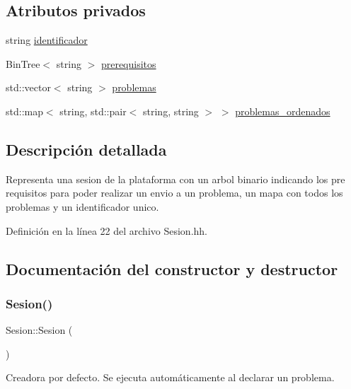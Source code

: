 \subsection*{Atributos privados}
\begin{DoxyCompactItemize}
\item 
string \mbox{\hyperlink{class_sesion_a1b9a6519f3476c8c733792dee9b9c842}{identificador}}
\item 
Bin\+Tree$<$ string $>$ \mbox{\hyperlink{class_sesion_abdfe53bdef12bfa9ab510cad99b0de27}{prerequisitos}}
\item 
std\+::vector$<$ string $>$ \mbox{\hyperlink{class_sesion_af3929f5b3478c9ab1334b4c62566d69e}{problemas}}
\item 
std\+::map$<$ string, std\+::pair$<$ string, string $>$ $>$ \mbox{\hyperlink{class_sesion_a4f770d029f7be9368a3abec6af7e8de7}{problemas\+\_\+ordenados}}
\end{DoxyCompactItemize}


\subsection{Descripción detallada}
Representa una sesion de la plataforma con un arbol binario indicando los pre requisitos para poder realizar un envio a un problema, un mapa con todos los problemas y un identificador unico. 

Definición en la línea 22 del archivo Sesion.\+hh.



\subsection{Documentación del constructor y destructor}
\mbox{\label{class_sesion_adf5a84efa8e2629b30ad89df74cfc0a2}} 
\subsubsection{\texorpdfstring{Sesion()}{Sesion()}\hspace{0.1cm}{\footnotesize\ttfamily [1/2]}}
{\footnotesize\ttfamily Sesion\+::\+Sesion (\begin{DoxyParamCaption}{ }\end{DoxyParamCaption})}



Creadora por defecto. Se ejecuta automáticamente al declarar un problema. 

